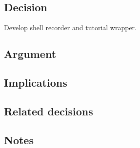 \subsection*{Decision}

Develop shell recorder and tutorial wrapper.

\subsection*{Argument}

\subsection*{Implications}

\subsection*{Related decisions}

\subsection*{Notes}